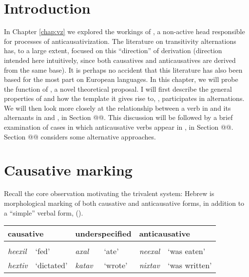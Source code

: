 \label{chap:vd}
\section{Introduction}
In Chapter \ref{chap:vz} we explored the workings of {\vz}, a non-active head responsible for processes of anticausativization. The literature on transitivity alternations has, to a large extent, focused on this ``direction'' of derivation (direction intended here intuitively, since both causatives and anticausatives are derived from the same base). It is perhaps no accident that this literature has also been based for the most part on European languages. In this chapter, we will probe the function of {\vd}, a novel theoretical proposal. I will first describe the general properties of {\vd} and how the template it gives rise to, {\thif}, participates in alternations. We will then look more closely at the relationship between a verb in {\tkal} and its alternants in {\tnif} and {\thif}, in Section @@. This discussion will be followed by a brief examination of cases in which anticausative verbs appear in {\thif}, in Section @@. Section @@ considers some alternative approaches.

\section{Causative marking}
Recall the core observation motivating the trivalent system: Hebrew is morphological marking of both causative and anticausative forms, in addition to a ``simple'' verbal form, (\nextx).
\ex\label{vd:ex:alternations-heb}
	\begin{tabular}{ll|ll|ll}
	\multicolumn{2}{P{4.2cm}|}{causative} &	\multicolumn{2}{P{4cm}|}{underspecified}	& \multicolumn{2}{P{4.2cm}}{anticausative}\\\hline
	\multicolumn{2}{c|}{\thif}	&	\multicolumn{2}{c|}{\tkal}	& \multicolumn{2}{c}{\tnif}\\
	\emph{heexil}	& `fed' &	\emph{axal}	& `ate'	&	\emph{neexal}	& `was eaten' \\
	\emph{hextiv}	& `dictated' &	\emph{katav}	& `wrote'	&	\emph{nixtav}	& `was written' \\
	\end{tabular}
\xe

